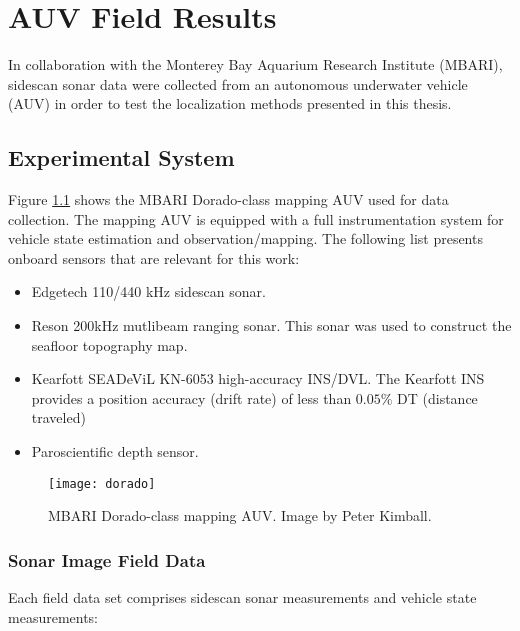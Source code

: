 
\chapter{AUV Field Results}
\label{ch.AUV}

In collaboration with the Monterey Bay Aquarium Research Institute (MBARI), sidescan sonar data were collected from an autonomous underwater vehicle (AUV) in order to test the localization methods presented in this thesis.

\section{Experimental System}
\label{auv.Experimental}

Figure \ref{fig:mappingAUV} shows the MBARI Dorado-class mapping AUV used for data collection.
The mapping AUV is equipped with a full instrumentation system for vehicle state estimation and observation/mapping.
The following list presents onboard sensors that are relevant for this work:

\begin{itemize}
\item Edgetech 110/440 kHz sidescan sonar.
\item Reson 200kHz mutlibeam ranging sonar.  This sonar was used to construct the seafloor topography map.
\item Kearfott SEADeViL KN-6053 high-accuracy INS/DVL. The Kearfott INS provides a position accuracy (drift rate) of less than $0.05 \%$ DT (distance traveled)
\item Paroscientific depth sensor.
\end{itemize}

\begin{figure}[!h]
	\centering
		\texttt{[image: dorado]}
	\caption{MBARI Dorado-class mapping AUV.  Image by Peter Kimball.}
	\label{fig:mappingAUV}
\end{figure}

\subsection{Sonar Image Field Data}
\label{auv.Experimental.Sonar}

Each field data set comprises sidescan sonar measurements and vehicle state measurements:

